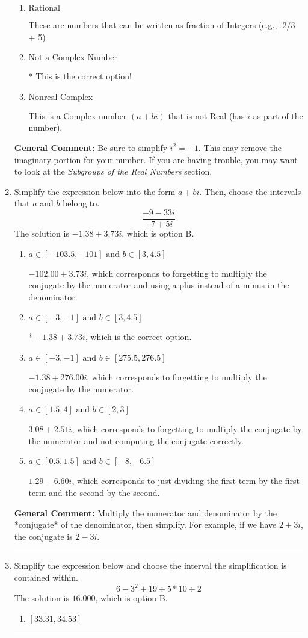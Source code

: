 \documentclass{extbook}[14pt]
\newcommand{\litem}[1]{\item #1

\rule{\textwidth}{0.4pt}}
\begin{document}
\begin{enumerate}
{\begin{enumerate}[label=\Alph*.]
This is a Complex number $(a+bi)$ that \textbf{only} has an imaginary part like $2i$.
\item \( \text{Rational} \)

These are numbers that can be written as fraction of Integers (e.g., -2/3 + 5)
\item \( \text{Not a Complex Number} \)

* This is the correct option!
\item \( \text{Nonreal Complex} \)

This is a Complex number $(a+bi)$ that is not Real (has $i$ as part of the number).
\end{enumerate}

\textbf{General Comment:} Be sure to simplify $i^2 = -1$. This may remove the imaginary portion for your number. If you are having trouble, you may want to look at the \textit{Subgroups of the Real Numbers} section.
}
\litem{
Simplify the expression below into the form $a+bi$. Then, choose the intervals that $a$ and $b$ belong to.
\[ \frac{-9 - 33 i}{-7 + 5 i} \]The solution is \( -1.38  + 3.73 i \), which is option B.\begin{enumerate}[label=\Alph*.]
\item \( a \in [-103.5, -101] \text{ and } b \in [3, 4.5] \)

 $-102.00  + 3.73 i$, which corresponds to forgetting to multiply the conjugate by the numerator and using a plus instead of a minus in the denominator.
\item \( a \in [-3, -1] \text{ and } b \in [3, 4.5] \)

* $-1.38  + 3.73 i$, which is the correct option.
\item \( a \in [-3, -1] \text{ and } b \in [275.5, 276.5] \)

 $-1.38  + 276.00 i$, which corresponds to forgetting to multiply the conjugate by the numerator.
\item \( a \in [1.5, 4] \text{ and } b \in [2, 3] \)

 $3.08  + 2.51 i$, which corresponds to forgetting to multiply the conjugate by the numerator and not computing the conjugate correctly.
\item \( a \in [0.5, 1.5] \text{ and } b \in [-8, -6.5] \)

 $1.29  - 6.60 i$, which corresponds to just dividing the first term by the first term and the second by the second.
\end{enumerate}

\textbf{General Comment:} Multiply the numerator and denominator by the *conjugate* of the denominator, then simplify. For example, if we have $2+3i$, the conjugate is $2-3i$.
}
\litem{
Simplify the expression below and choose the interval the simplification is contained within.
\[ 6 - 3^2 + 19 \div 5 * 10 \div 2 \]The solution is \( 16.000 \), which is option B.\begin{enumerate}[label=\Alph*.]
\item \( [33.31, 34.53] \)


\end{enumerate}}
\end{enumerate}
\end{document}
